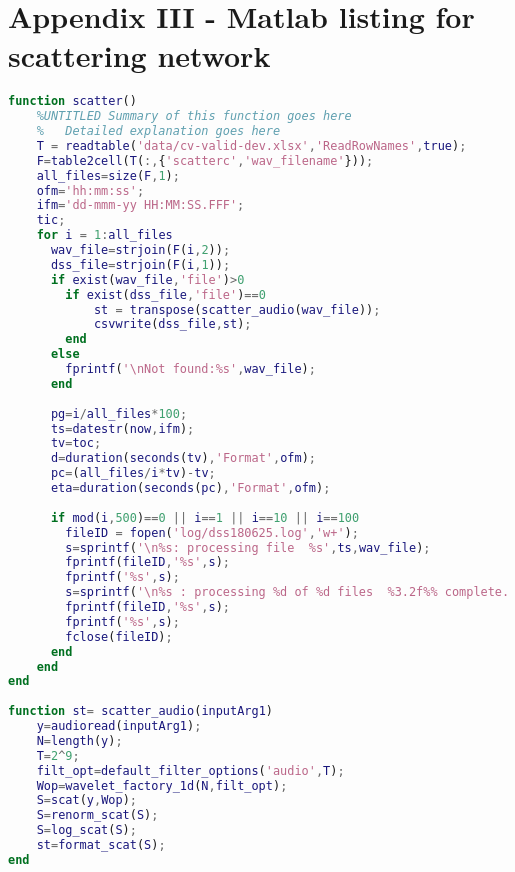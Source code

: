 
\section*{Appendix III - Matlab listing for scattering network}
\begin{lstlisting}[language=Matlab]
function scatter()
    %UNTITLED Summary of this function goes here
    %   Detailed explanation goes here
    T = readtable('data/cv-valid-dev.xlsx','ReadRowNames',true);
    F=table2cell(T(:,{'scatterc','wav_filename'}));
    all_files=size(F,1);
    ofm='hh:mm:ss';
    ifm='dd-mmm-yy HH:MM:SS.FFF';
    tic;
    for i = 1:all_files
      wav_file=strjoin(F(i,2));
      dss_file=strjoin(F(i,1));
      if exist(wav_file,'file')>0
      	if exist(dss_file,'file')==0
        	st = transpose(scatter_audio(wav_file));
        	csvwrite(dss_file,st);
      	end
      else
      	fprintf('\nNot found:%s',wav_file);
      end
 
      pg=i/all_files*100;
      ts=datestr(now,ifm);
      tv=toc;
      d=duration(seconds(tv),'Format',ofm);
      pc=(all_files/i*tv)-tv;
      eta=duration(seconds(pc),'Format',ofm);
 
      if mod(i,500)==0 || i==1 || i==10 || i==100
      	fileID = fopen('log/dss180625.log','w+');
      	s=sprintf('\n%s: processing file  %s',ts,wav_file);
      	fprintf(fileID,'%s',s);
      	fprintf('%s',s);
      	s=sprintf('\n%s : processing %d of %d files  %3.2f%% complete.. time elapsed = %s, eta = %s',ts,i,all_files,pg,d,eta);
      	fprintf(fileID,'%s',s);
      	fprintf('%s',s);
      	fclose(fileID);
      end
    end
end
 
function st= scatter_audio(inputArg1)
    y=audioread(inputArg1);
    N=length(y);
    T=2^9;
    filt_opt=default_filter_options('audio',T);
    Wop=wavelet_factory_1d(N,filt_opt);
    S=scat(y,Wop);
    S=renorm_scat(S);
    S=log_scat(S);
    st=format_scat(S);
end

\end{lstlisting}